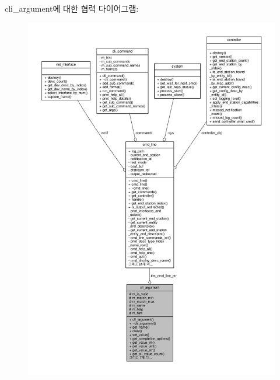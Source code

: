 cli\+\_\+argument에 대한 협력 다이어그램\+:
\nopagebreak
\begin{figure}[H]
\begin{center}
\leavevmode
\includegraphics[width=350pt]{classcli__argument__coll__graph}
\end{center}
\end{figure}
